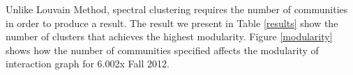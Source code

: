 Unlike Louvain Method, spectral clustering requires the number of communities in order to produce a result. The result we present in Table \ref{results} show the number of clusters that achieves the highest modularity. Figure \ref{modularity} shows how the number of communities specified affects the modularity of interaction graph for 6.002x Fall 2012. 








